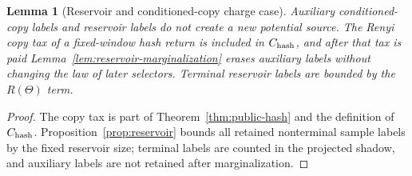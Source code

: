 \documentclass[11pt]{article}
\newtheorem{lemma}[theorem]{Lemma}
\begin{document}
\begin{lemma}[Reservoir and conditioned-copy charge case]
\label{lem:reservoir-charge-case}
Auxiliary conditioned-copy labels and reservoir labels do not create a new
potential source.  The Renyi copy tax of a fixed-window hash return is included
in $C_{\rm hash}$, and after that tax is paid
Lemma~\ref{lem:reservoir-marginalization} erases auxiliary labels without
changing the law of later selectors.  Terminal reservoir labels are bounded by
the $R(\Theta)$ term.
\end{lemma}

\begin{proof}
The copy tax is part of Theorem~\ref{thm:public-hash} and the definition of
$C_{\rm hash}$.  Proposition~\ref{prop:reservoir} bounds all retained
nonterminal sample labels by the fixed reservoir size; terminal labels are
counted in the projected shadow, and auxiliary labels are not retained after
marginalization.
\end{proof}
\end{document}
